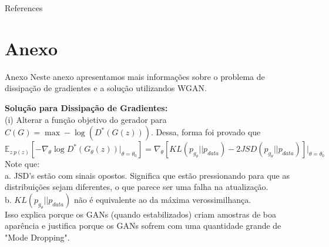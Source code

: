 \documentclass[10pt]{beamer}
\begin{document}
\begin{frame}[allowframebreaks]{References}

  \renewcommand{\section}[2]{}%
  
  

\end{frame}

\AtBeginSection{}
\section[Anexo]{Anexo}
\begin{frame}[fragile]{Anexo}
	Neste anexo apresentamos mais informações sobre o problema de 
	dissipação de gradientes e a solução utilizandos WGAN.

  \small
  \textbf{Solução para Dissipação de Gradientes:}\\
  (i) Alterar a função objetivo do gerador para $C(G) = \max -\log(D^*(G(z)))$. Dessa, forma foi provado que
  $$\mathbb{E}_{z~p(z)}\left[-\nabla_{\theta}\log{D^*(G_{\theta}(z))|_{\theta=\theta_{0}}} \right] = \nabla_{\theta}[KL(p_{g_{\theta}}||p_{data}) - 2JSD(p_{g_{\theta}}||p_{data})]|_{\theta = \theta_0} $$
  Note que: \\
  a. JSD's estão com sinais opostos. Significa que estão pressionando para que as distribuições sejam diferentes, o que parece ser uma falha na atualização.\\
  b. $KL(p_{g_{\theta}}||p_{data})$ não é equivalente ao da máxima verossimilhança.\\
  Isso explica porque os GANs (quando estabilizados) criam amostras de boa aparência e justifica porque os GANs sofrem com uma quantidade grande de "Mode Dropping".
\end{frame}
\end{document}

